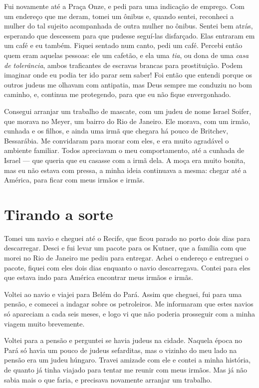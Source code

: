 Fui novamente até a Praça Onze, e pedi para uma indicação de
emprego. Com um endereço que me deram, tomei um ônibus e, quando
sentei, reconheci a mulher do tal sujeito acompanhada de outra
mulher no ônibus. Sentei bem atrás, esperando que descessem 
para que pudesse seguí-las disfarçado. Elas entraram em um café
e eu também. Fiquei sentado num canto, pedi um café. Percebi então
quem eram aquelas pessoas: ele um cafetão, e ela uma \textit{tia}, ou dona de uma \textit{casa de tolerância}, ambos traficantes de escravas
brancas para prostituição. Podem imaginar onde eu podia ter ido parar 
sem saber! Foi então que entendi porque os outros judeus me olhavam com
antipatia, mas Deus sempre me conduziu no bom caminho, e, continua me
protegendo, para que eu não fique envergonhado.

Consegui arranjar um trabalho de mascate, com um judeu de nome Israel
Soifer, que morava no Meyer, um bairro do Rio de Janeiro. Ele morava,
com um irmão, cunhada e os filhos, e ainda uma irmã que chegara há pouco
de Britchev, Bessarábia. Me convidaram para morar com eles, e era muito
agradável o ambiente familiar. Todos apreciavam o meu comportamento,
até a cunhada de Israel --- que queria que eu casasse com a irmã dela. A moça
era muito bonita, mas eu não estava com pressa, a minha ideia continuava
a mesma: chegar até a América, para ficar com meus irmãos e irmãs.

\chapter{Tirando a sorte}

Tomei um navio e cheguei até o Recife, que ficou parado no porto
dois dias para descarregar. Desci e fui levar um pacote para os 
Kutner, que a família
com que morei no Rio de Janeiro me pediu para entregar. 
Achei o endereço e entreguei o pacote, fiquei com eles dois
dias enquanto o navio descarregava. Contei para eles que estava
indo para América encontrar meus irmãos e irmãs.

Voltei ao navio e viajei para Belém do Pará. Assim que cheguei, fui para
uma pensão, e comecei a indagar sobre os petroleiros. Me
informaram que estes navios só apareciam a cada seis meses, e logo vi que
não poderia prosseguir com a minha viagem muito brevemente.

Voltei para a pensão e perguntei se havia judeus na cidade. Naquela
época no Pará só havia um pouco de judeus sefarditas, mas o vizinho do meu lado na pensão 
era um judeu húngaro. Travei amizade com ele e
contei a minha história, de quanto já tinha viajado para tentar me
reunir com meus irmãos. Mas já não sabia mais o que faria, e precisava novamente
arranjar um trabalho.

